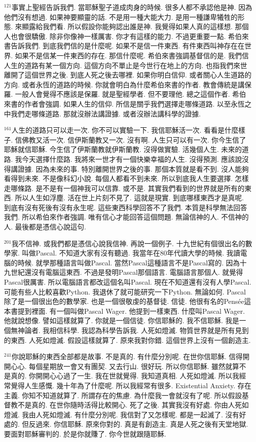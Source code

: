 \documentclass{book}
\begin{document}
$^{121}$事實上聖經告訴我們.
當耶穌聖子道成肉身的時候.
很多人都不承認他是神.
因為他們沒有想過.
如果神要顯靈的話.
不是用一種大能大力.
是用一種謙卑犧牲的形態.
來顯露給我們看.
所以假設你能夠認出誰是神.
我覺得如果人真的這樣想.
那個人也會很驕傲.
除非你像神一樣厲害.
你才有這樣的能力.
不過更重要一點.
希伯來書告訴我們.
到底我們信的是什麼呢.
如果不是信一件東西.
有件東西叫神存在在世界.
如果不是信某一件東西的存在.
那信什麼呢.
希伯來書強調基督信的是.
我們信人生的道路有某一個方向.
這個方向不單止是今世行在地上的方向.
也指我們來世離開了這個世界之後.
到底人死之後去哪裡.
如果你明白信仰.
或者關心人生道路的方向.
或者永恆的道路的時候.
你就會明白為什麼希伯來書的作者.
教會傳統是講保羅.
一般人會覺得不應該是保羅.
就是聖經學者.
但不要理他.
總之這個作者.
希伯來書的作者會強調.
如果人生的信仰.
所信是關乎我們選擇走哪條道路.
以至永恆之中我們走哪條道路.
那就沒辦法講證據.
或者沒辦法講科學的證據.

$^{161}$人生的道路只可以走一次.
你不可以實驗一下.
我信耶穌活一次.
看看是什麼樣子.
信佛教又活一次.
信伊斯蘭教又一次.
沒有啊.
人生只可以有一次.
你今生信了耶穌就信耶穌.
今生信了伊斯蘭教就伊斯蘭教.
沒得做實驗.
活幾個人生.
未來的道路.
我今天選擇什麼路.
我將來一世才有一個快樂幸福的人生.
沒得預測.
應該說沒得講證據.
因為未來的事.
特別離開世界之後的事.
那個本質就是看不到.
沒人能夠看得到未來.
不是像科幻小說.
每個人都看不到未來.
所以到底我人生要選擇.
怎樣走哪條路.
是不是有一個神我可以信靠.
或不是.
其實我們看到的世界就是所有的東西.
所以人生如浮塵.
活在世上片刻不見了.
這就是現實.
到底哪樣東西才是真呢.
到底有沒有死後有沒有永生呢.
這些東西科學回答不了我們.
本質是科學無法回答我們.
所以希伯來作者強調.
唯有信心才能回答這個問題.
無論信神的人.
不信神的人.
最後都是憑信心說這句.

$^{201}$我不信神.
或我們都是憑信心說我信神.
再說一個例子.
十九世紀有個很出名的數學家.
叫做Pascal.
不知道大家有沒有聽過.
我當年在80年代讀大學的時候.
我讀電腦的時候.
就學那種語言叫做Pascal.
當然Pascal這種語言不是Pascal寫的.
因為十九世紀還沒有電腦這東西.
不過是發明Pascal那個語言.
電腦語言那個人.
就覺得Pascal很厲害.
所以電腦語言都改這個名叫Pascal.
現在不知道還有沒有人學Pascal.
可能有些人比較喜歡Python.
我退休了就可能研究一下Python.
無論如何.
Pascal除了是一個很出色的數學家.
也是一個很敬虔的基督徒.
信徒.
他很有名的Pensée這本書提到裡面.
有一個叫做Pascal Wager.
他提到一樣東西.
什麼叫Pascal Wager.
他就說想像.
譬如這樣就算了.
你就是一個信徒.
你信耶穌的.
我不信耶穌.
我是一個無神論者.
我相信科學.
我認為科學告訴我.
人死如燈滅.
物質世界就是所有見到的東西.
人死如燈滅.
假設這樣就算了.
原來我對你錯.
這個世界上沒有一個創造主.

$^{241}$你說耶穌的東西全部都是故事.
不是真的.
有什麼分別呢.
在世你信耶穌.
信得開開心心.
每個星期放一會又有團契.
又去行山.
很好玩.
所以你信耶穌.
雖然就算不是真的.
你開開心心過了一生.
我在世就覺得.
我知道真相.
人死如燈滅.
所以我經常覺得人生感慨.
幾十年為了什麼呢.
所以我經常有很多.
Existential Anxiety.
存在主義.
你知不知道就算了.
所謂存在的焦慮.
為什麼我一會就沒有了呢.
所以假設基督教不是真的.
在世你隨時活得比較開心.
死了之後.
其實我沒有好處.
你由人死如燈滅.
我由人死如燈滅.
有什麼分別呢.
我信對了又怎樣呢.
都是一起滅了.
沒有好處的.
但反過來.
你信耶穌.
原來你對的.
真是有創造主.
真是人死之後有天堂地獄.
要面對耶穌審判的.
於是你就賺了.
你今世就跟隨耶穌.
\end{document}
